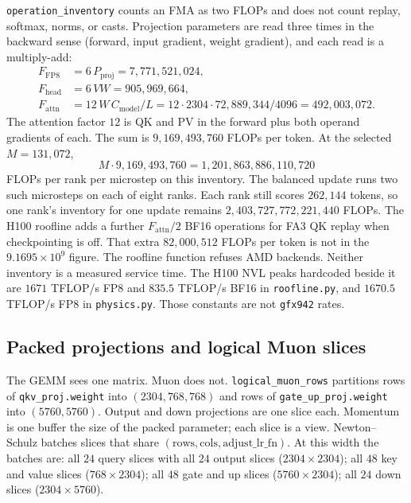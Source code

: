 \documentclass[11pt]{article}
\DeclareRobustCommand{\code}[1]{\texttt{#1}}
\begin{document}
\code{operation\_inventory} counts an FMA as two FLOPs and does not count
replay, softmax, norms, or casts. Projection parameters are read three times
in the backward sense (forward, input gradient, weight gradient), and each
read is a multiply-add:
\begin{align*}
F_{\mathrm{FP8}}
 &= 6\,P_{\mathrm{proj}}
  = 7{,}771{,}521{,}024,\\
F_{\mathrm{head}}
 &= 6\,VW
  = 905{,}969{,}664,\\
F_{\mathrm{attn}}
 &= 12\,W\,C_{\mathrm{model}}/L
  = 12\cdot 2304\cdot 72{,}889{,}344/4096
  = 492{,}003{,}072.
\end{align*}
The attention factor \(12\) is QK and PV in the forward plus both operand
gradients of each. The sum is \(9{,}169{,}493{,}760\) FLOPs per token.
At the selected \(M=131{,}072\),
\begin{equation}
M\cdot 9{,}169{,}493{,}760 = 1{,}201{,}863{,}886{,}110{,}720
\end{equation}
FLOPs per rank per microstep on this inventory. The balanced update runs two
such microsteps on each of eight ranks. Each rank still scores \(262{,}144\)
tokens, so one rank's inventory for one update remains
\(2{,}403{,}727{,}772{,}221{,}440\) FLOPs. The H100 roofline adds a
further \(F_{\mathrm{attn}}/2\) BF16 operations for FA3 QK replay when
checkpointing is off. That extra \(82{,}000{,}512\) FLOPs per token is not
in the \(9.1695\times 10^{9}\) figure. The roofline function refuses AMD
backends. Neither inventory is a measured service time. The H100 NVL peaks
hardcoded beside it are \(1671\) TFLOP/s FP8 and \(835.5\) TFLOP/s BF16 in
\code{roofline.py}, and \(1670.5\) TFLOP/s FP8 in \code{physics.py}. Those
constants are not \code{gfx942} rates.

\subsection{Packed projections and logical Muon slices}

The GEMM sees one matrix. Muon does not. \code{logical\_muon\_rows} partitions
rows of \code{qkv\_proj.weight} into \((2304,768,768)\) and rows of
\code{gate\_up\_proj.weight} into \((5760,5760)\). Output and down
projections are one slice each. Momentum is one buffer the size of the
packed parameter; each slice is a view. Newton--Schulz batches slices that
share \((\mathrm{rows},\mathrm{cols},\mathrm{adjust\_lr\_fn})\). At this
width the batches are: all \(24\) query slices with all \(24\) output slices
(\(2304\times 2304\)); all \(48\) key and value slices (\(768\times 2304\));
all \(48\) gate and up slices (\(5760\times 2304\)); all \(24\) down slices
(\(2304\times 5760\)).
\end{document}
